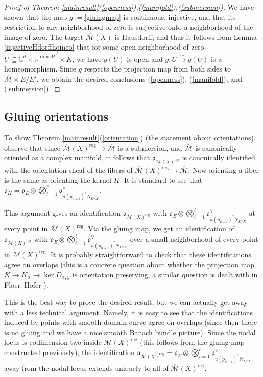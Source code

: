 \documentclass[12pt]{article}
\theoremstyle{definition}
\theoremstyle{remark}
\numberwithin{equation}{subsection}
\newcommand{\oo}{\mathfrak o}
\newcommand{\CC}{\mathbb C}
\newcommand{\RR}{\mathbb R}
\newcommand{\Mbar}{\overline{\mathcal M}}
\newcommand{\reg}{\mathrm{reg}}
\begin{document}
\begin{proof}[Proof of Theorem \ref{mainresult}(\ref{openness}),(\ref{manifold}),(\ref{submersion})]
We have shown that the map $g:=$\eqref{gluingmap} is continuous, injective, and that its restriction to any neighborhood of zero is surjective onto a neighborhood of the image of zero.  The target $\Mbar(X)$ is Hausdorff, and thus it follows from Lemma \ref{injectiveHdorffhomeo} that for some open neighborhood of zero $U\subseteq\CC^d\times\RR^{\dim\Mbar^d}\times K$, we have $g(U)$ is open and $g:U\xrightarrow\sim g(U)$ is a homeomorphism.  Since $g$ respects the projection map from both sides to $\Mbar\times E/E'$, we obtain the desired conclusions (\ref{openness}), (\ref{manifold}), and (\ref{submersion}).
\end{proof}

\subsection{Gluing orientations}

To show Theorem \ref{mainresult}(\ref{orientation}) (the statement about orientations), observe that since $\Mbar(X)^\reg\to\Mbar$ is a submersion, and $\Mbar$ is canonically oriented as a complex manifold, it follows that $\oo_{\Mbar(X)^\reg}$ is canonically identified with the orientation sheaf of the fibers of $\Mbar(X)^\reg\to\Mbar$.  Now orienting a fiber is the same as orienting the kernel $K$.  It is standard to see that $\oo_K=\oo_E\otimes\bigotimes_{i=1}^\ell\oo_{u(p_{n+i})^\ast N_{D/X}}^\vee$.

This argument gives an identification $\oo_{\Mbar(X)^\reg}$ with $\oo_E\otimes\bigotimes_{i=1}^\ell\oo_{u(p_{n+i})^\ast N_{D/X}}^\vee$ at every point in $\Mbar(X)^\reg$.  Via the gluing map, we get an identification of $\oo_{\Mbar(X)^\reg}$ with $\oo_E\otimes\bigotimes_{i=1}^\ell\oo_{u(p_{n+i})^\ast N_{D/X}}^\vee$ over a small neighborhood of every point in $\Mbar(X)^\reg$.  It is probably straightforward to check that these identifications agree on overlaps (this is a concrete question about whether the projection map $K\to K_\alpha\to\ker D_{\alpha,y}$ is orientation preserving; a similar question is dealt with in Floer--Hofer \cite{floerhoferorientations}).

This is the best way to prove the desired result, but we can actually get away with a less technical argument.  Namely, it is easy to see that the identifications induced by points with smooth domain curve agree on overlaps (since then there is no gluing and we have a nice smooth Banach bundle picture).  Since the nodal locus is codimension two inside $\Mbar(X)^\reg$ (this follows from the gluing map constructed previously), the identification $\oo_{\Mbar(X)^\reg}=\oo_E\otimes\bigotimes_{i=1}^\ell\oo_{u(p_{n+i})^\ast N_{D/X}}^\vee$ away from the nodal locus extends uniquely to all of $\Mbar(X)^\reg$.
\end{document}
